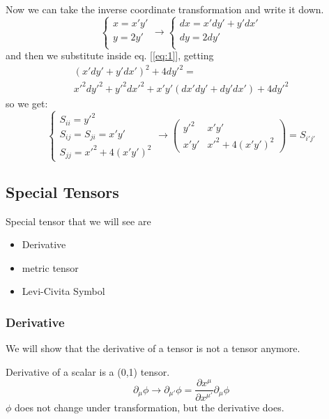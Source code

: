 Now we can take the inverse coordinate transformation and write it down.
\begin{equation}
\begin{cases}
x = x'y' \\
 y = 2y'\\
\end{cases} \to 
\begin{cases}
dx = x'dy' + y'dx' \\
dy = 2dy' \\
\end{cases}
\end{equation}
and then we substitute inside eq. [\ref{eq:1}], getting
\begin{gather*}
	\left( x'dy' + y'dx' \right)^{2} + 4dy'^{2} = \\
	x'^{2}dy'^{2} + y'^{2}dx'^{2} + x'y'\left( dx'dy'+dy'dx' \right) + 4dy'^{2} 
\end{gather*}
so we get:
\begin{equation}
\begin{cases}
S_{ii} = y'^{2} \\
S_{ij} = S_{ji} = x'y' \\
S_{jj} = x'^{2} + 4\left( x'y' \right)^{2}
\end{cases}
\to 
\begin{pmatrix}
y'^{2} & x'y' \\
x'y' & x'^{2}+4\left( x'y' \right)^{2}
\end{pmatrix} = S_{i'j'} 
\end{equation}

\subsection{Special Tensors}
Special tensor that we will see are
\begin{itemize}
	\item Derivative
	\item metric tensor
	\item Levi-Civita Symbol
\end{itemize}

\subsubsection{Derivative}
We will show that the derivative of a tensor is not a tensor anymore.\par

Derivative of a scalar is a (0,1) tensor.
\[
\partial_{\mu }\phi \to \partial_{\mu '}\phi = \frac{\partial x^{\mu }}{\partial x^{\mu '}} \partial_{\mu }\phi 
\]
$\phi $ does not change under transformation, but the derivative does.

